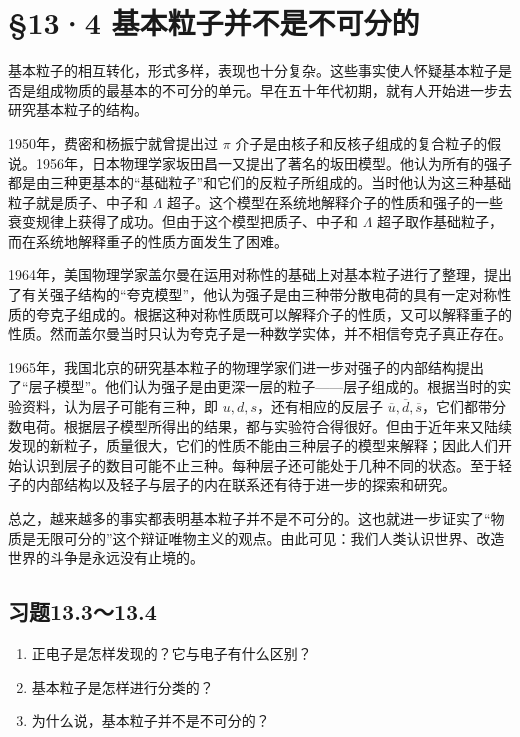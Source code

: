 \section{§13·4
基本粒子并不是不可分的}

基本粒子的相互转化，形式多样，表现也十分复杂。这些事实使人怀疑基本粒子是否是组成物质的最基本的不可分的单元。早在五十年代初期，就有人开始进一步去研究基本粒子的结构。

1950年，费密和杨振宁就曾提出过 \(\pi\)
介子是由核子和反核子组成的复合粒子的假说。1956年，日本物理学家坂田昌一又提出了著名的坂田模型。他认为所有的强子都是由三种更基本的``基础粒子''和它们的反粒子所组成的。当时他认为这三种基础粒子就是质子、中子和
\(\Lambda\)
超子。这个模型在系统地解释介子的性质和强子的一些衰变规律上获得了成功。但由于这个模型把质子、中子和
\(\Lambda\) 超子取作基础粒子，而在系统地解释重子的性质方面发生了困难。

1964年，美国物理学家盖尔曼在运用对称性的基础上对基本粒子进行了整理，提出了有关强子结构的``夸克模型''，他认为强子是由三种带分散电荷的具有一定对称性质的夸克子组成的。根据这种对称性质既可以解释介子的性质，又可以解释重子的性质。然而盖尔曼当时只认为夸克子是一种数学实体，并不相信夸克子真正存在。

1965年，我国北京的研究基本粒子的物理学家们进一步对强子的内部结构提出了``层子模型''。他们认为强子是由更深一层的粒子------层子组成的。根据当时的实验资料，认为层子可能有三种，即
\(u, d, s\)，还有相应的反层子
\(\overline{u}, \overline{d}, \overline{s}\)，它们都带分数电荷。根据层子模型所得出的结果，都与实验符合得很好。但由于近年来又陆续发现的新粒子，质量很大，它们的性质不能由三种层子的模型来解释；因此人们开始认识到层子的数目可能不止三种。每种层子还可能处于几种不同的状态。至于轻子的内部结构以及轻子与层子的内在联系还有待于进一步的探索和研究。

总之，越来越多的事实都表明基本粒子并不是不可分的。这也就进一步证实了``物质是无限可分的''这个辩证唯物主义的观点。由此可见：我们人类认识世界、改造世界的斗争是永远没有止境的。

\subsection{习题13.3～13.4}

\begin{enumerate}
\item
  正电子是怎样发现的？它与电子有什么区别？
\item
  基本粒子是怎样进行分类的？
\item
  为什么说，基本粒子并不是不可分的？
\end{enumerate}

